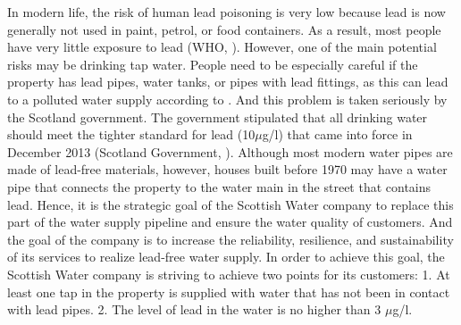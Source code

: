 \documentclass[11pt,twoside]{article}
\numberwithin{Theorem}{section}
\numberwithin{Definition}{section}
\numberwithin{Lemma}{section}
\numberwithin{Algorithm}{section}
\numberwithin{equation}{section}
\begin{document}
In modern life, the risk of human lead poisoning is very low because lead is now generally not used in paint, petrol, or food containers. As a result, most people have very little exposure to lead (WHO, \citeyear{who}). However, one of the main potential risks may be drinking tap water. People need to be especially careful if the property has lead pipes, water tanks, or pipes with lead fittings, as this can lead to a polluted water supply according to \cite{tee}. And this problem is taken seriously by the Scotland government. The government stipulated that all drinking water should meet the tighter standard for lead (10$\mu$g/l) that came into force in December 2013 (Scotland Government, \citeyear{government}). Although most modern water pipes are made of lead-free materials, however, houses built before 1970 may have a water pipe that connects the property to the water main in the street that contains lead. Hence, it is the strategic goal of the Scottish Water company to replace this part of the water supply pipeline and ensure the water quality of customers. And the goal of the company is to increase the reliability, resilience, and sustainability of its services to realize lead-free water supply. In order to achieve this goal, the Scottish Water company is striving to achieve two points for its customers: 1. At least one tap in the property is supplied with water that has not been in contact with lead pipes. 2. The level of lead in the water is no higher than 3 $\mu$g/l.

\clearpage
\end{document}
